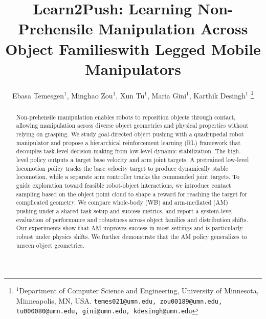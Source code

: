 \documentclass[letterpaper, 10 pt, conference]{ieeeconf}  %
\title{\LARGE \bf
Learn2Push: Learning Non-Prehensile Manipulation Across Object Families\linebreak with Legged Mobile Manipulators}
\author{Ebasa Temesgen$^{1}$, Minghao Zou$^{1}$, Xun Tu$^{1}$, Maria Gini$^{1}$, Karthik Desingh$^{1}$%
\thanks{$^{1}$Department of Computer Science and Engineering, University of Minnesota, Minneapolis, MN, USA.
{\tt\small temes021@umn.edu, zou00189@umn.edu, tu000080@umn.edu, gini@umn.edu, kdesingh@umn.edu}}%
}
\begin{document}
\maketitle




\thispagestyle{empty}
\pagestyle{empty}

\begin{abstract}

Non-prehensile manipulation enables robots to reposition objects through contact, allowing manipulation across diverse object geometries and physical properties without relying on grasping. We study goal-directed object pushing with a quadrupedal robot manipulator and propose a hierarchical reinforcement learning (RL) framework that decouples task-level decision-making from low-level dynamic stabilization. The high-level policy outputs a target base velocity and arm joint targets. A pretrained low-level locomotion policy tracks the base velocity target to produce dynamically stable locomotion, while a separate arm controller tracks the commanded joint targets. To guide exploration toward feasible robot-object interactions, we introduce contact sampling based on the object point cloud to shape a reward for reaching the target for complicated geometry. We compare whole-body (WB) and arm-mediated (AM) pushing under a shared task setup and success metrics, and report a system-level evaluation of performance and robustness across object families and distribution shifts. Our experiments show that AM improves success in most settings and is particularly robust under physics shifts. We further demonstrate that the AM policy generalizes to unseen object geometries.







\end{abstract}
\end{document}
